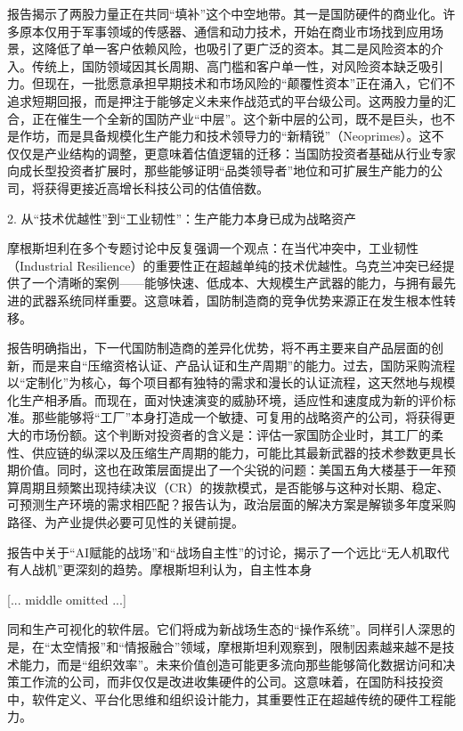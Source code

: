\documentclass[11pt]{ctexart}
\begin{document}
报告揭示了两股力量正在共同“填补”这个中空地带。其一是国防硬件的商业化。许多原本仅用于军事领域的传感器、通信和动力技术，开始在商业市场找到应用场景，这降低了单一客户依赖风险，也吸引了更广泛的资本。其二是风险资本的介入。传统上，国防领域因其长周期、高门槛和客户单一性，对风险资本缺乏吸引力。但现在，一批愿意承担早期技术和市场风险的“颠覆性资本”正在涌入，它们不追求短期回报，而是押注于能够定义未来作战范式的平台级公司。这两股力量的汇合，正在催生一个全新的国防产业“中层”。这个新中层的公司，既不是巨头，也不是作坊，而是具备规模化生产能力和技术领导力的“新精锐”（Neoprimes）。这不仅仅是产业结构的调整，更意味着估值逻辑的迁移：当国防投资者基础从行业专家向成长型投资者扩展时，那些能够证明“品类领导者”地位和可扩展生产能力的公司，将获得更接近高增长科技公司的估值倍数。

2. 从“技术优越性”到“工业韧性”：生产能力本身已成为战略资产

摩根斯坦利在多个专题讨论中反复强调一个观点：在当代冲突中，工业韧性（Industrial Resilience）的重要性正在超越单纯的技术优越性。乌克兰冲突已经提供了一个清晰的案例——能够快速、低成本、大规模生产武器的能力，与拥有最先进的武器系统同样重要。这意味着，国防制造商的竞争优势来源正在发生根本性转移。

报告明确指出，下一代国防制造商的差异化优势，将不再主要来自产品层面的创新，而是来自“压缩资格认证、产品认证和生产周期”的能力。过去，国防采购流程以“定制化”为核心，每个项目都有独特的需求和漫长的认证流程，这天然地与规模化生产相矛盾。而现在，面对快速演变的威胁环境，适应性和速度成为新的评价标准。那些能够将“工厂”本身打造成一个敏捷、可复用的战略资产的公司，将获得更大的市场份额。这个判断对投资者的含义是：评估一家国防企业时，其工厂的柔性、供应链的纵深以及压缩生产周期的能力，可能比其最新武器的技术参数更具长期价值。同时，这也在政策层面提出了一个尖锐的问题：美国五角大楼基于一年预算周期且频繁出现持续决议（CR）的拨款模式，是否能够与这种对长期、稳定、可预测生产环境的需求相匹配？报告认为，政治层面的解决方案是解锁多年度采购路径、为产业提供必要可见性的关键前提。

报告中关于“AI赋能的战场”和“战场自主性”的讨论，揭示了一个远比“无人机取代有人战机”更深刻的趋势。摩根斯坦利认为，自主性本身

[... middle omitted ...]

同和生产可视化的软件层。它们将成为新战场生态的“操作系统”。同样引人深思的是，在“太空情报”和“情报融合”领域，摩根斯坦利观察到，限制因素越来越不是技术能力，而是“组织效率”。未来价值创造可能更多流向那些能够简化数据访问和决策工作流的公司，而非仅仅是改进收集硬件的公司。这意味着，在国防科技投资中，软件定义、平台化思维和组织设计能力，其重要性正在超越传统的硬件工程能力。
\end{document}
